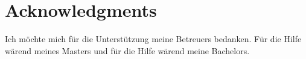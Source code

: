 
\chapter*{Acknowledgments}

Ich möchte mich für die Unterstützung meine Betreuers \supervisor bedanken. Für die Hilfe wärend meines Masters und für die Hilfe wärend meine Bachelors.
